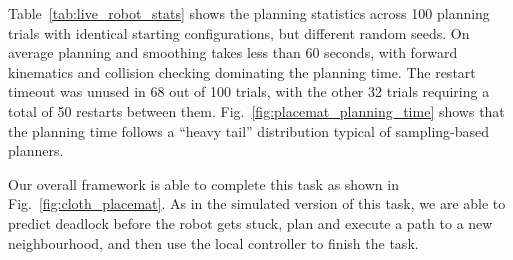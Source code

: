Table~\ref{tab:live_robot_stats} shows the planning statistics across 100 planning trials with identical starting configurations, but different random seeds. On average planning and smoothing takes less than 60 seconds, with forward kinematics and collision checking dominating the planning time. The restart timeout was unused in 68 out of 100 trials, with the other 32 trials requiring a total of 50 restarts between them. Fig.~\ref{fig:placemat_planning_time} shows that the planning time follows a ``heavy tail'' distribution typical of sampling-based planners.

Our overall framework is able to complete this task as shown in Fig.~\ref{fig:cloth_placemat}. As in the simulated version of this task, we are able to predict deadlock before the robot gets stuck, plan and execute a path to a new neighbourhood, and then use the local controller to finish the task.




